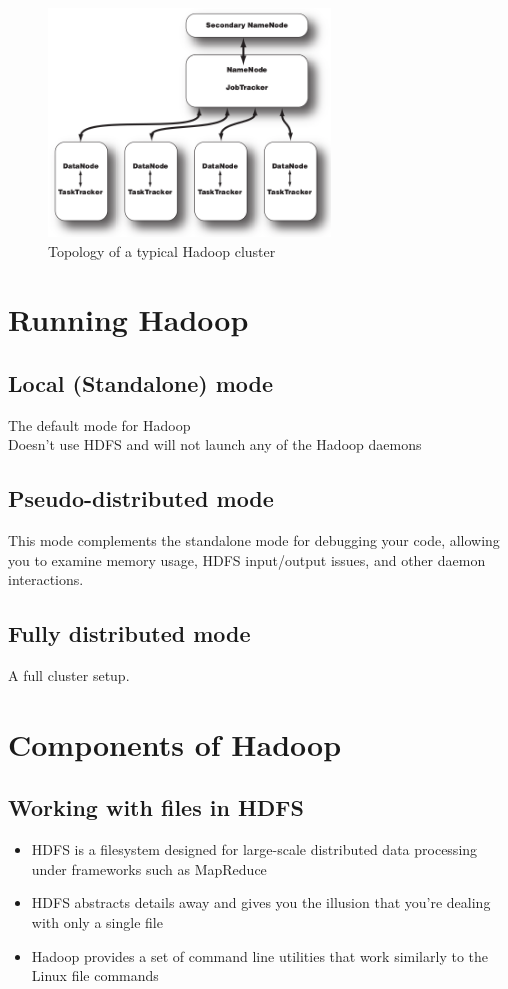 \documentclass{article}
\begin{document}
\begin{multicols}{2}
\begin{figure}[H]
\centering
\includegraphics[width=7.5cm]{assets/cluster_topology.png}
\caption{Topology of a typical Hadoop cluster}
\label{fig:awesome_image}
\end{figure}


\section{Running Hadoop}
\subsection {Local (Standalone) mode}
The default mode for Hadoop\\
Doesn’t use HDFS and will not launch any of the Hadoop daemons\\
\subsection {Pseudo-distributed mode}
This mode complements the standalone mode for debugging your code, allowing you to examine memory usage, HDFS input/output issues, and other daemon interactions.
\subsection {Fully distributed mode}
A full cluster setup.
\newpage
\pagebreak


\section{Components of Hadoop}
\subsection {Working with files in HDFS}
\begin{itemize}
\item HDFS is a filesystem designed for large-scale distributed data processing under frameworks such as MapReduce
\item HDFS abstracts details away and gives you the illusion that you’re dealing with only a single file
\item Hadoop provides a set of command line utilities that work similarly to the Linux file commands
\end{itemize}

\end{multicols}
\end{document}
